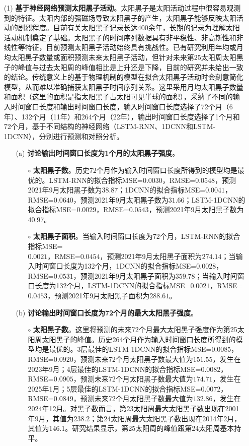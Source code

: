 \begin{enumerate}
  \item[(1)] \textbf{基于神经网络预测太阳黑子活动}。太阳黑子是太阳活动过程中很容易观测到的特征。太阳内部的强磁场导致太阳黑子的产生，太阳黑子能够反映太阳活动的剧烈程度。目前有关太阳黑子记录长达400余年，长期的记录为理解太阳活动机制奠定了基础。太阳黑子的时间序列数据具有非平稳性、非高斯性和非线性等特征，目前预测太阳黑子活动始终具有挑战性。已有研究利用年均或月均太阳黑子数量或面积预测未来太阳黑子活动，但针对未来第25太阳周太阳黑子的峰值与过去太阳周的峰值相比是上升还是下降，目前的研究并未给出一致的结论。传统意义上的基于物理机制的模型在拟合太阳黑子活动时会刻意简化模型，从而难以准确捕获太阳黑子时间序列关系。这里采用月均太阳黑子数量和面积（这里的面积是指太阳黑子占太阳可见半球的面积），采纳了不同的输入时间窗口长度和输出时间窗口长度，输入时间窗口长度选择了72个月（6年）、132个月（11年）和264个月（22年），输出时间窗口长度选择了1个月和72个月，基于不同结构的神经网络（LSTM-RNN、1DCNN和LSTM-1DCNN），分别进行预测和对照分析。
  \begin{itemize}
    \item[(a)] \textbf{讨论输出时间窗口长度为1个月的太阳黑子强度}。
    \begin{itemize}
      \item[$\circ$] \textbf{太阳黑子数}。历史72个月作为输入时间窗口长度所得到的模型均是最优的。LSTM-RNN的拟合指标MSE=$0.0030$，RMSE=$0.0548$，预测2021年9月太阳黑子数为$38.87$；1DCNN的拟合指标MSE=$0.0041$，RMSE=$0.0640$，预测2021年9月太阳黑子数为$31.66$；LSTM-1DCNN的拟合指标MSE=$0.0029$，RMSE=$0.0543$，预测2021年9月太阳黑子数为$40.97$。
      \item[$\circ$] \textbf{太阳黑子面积}。当输入时间窗口长度为72个月，LSTM-RNN的拟合指标MSE=\\$0.0021$，RMSE=$0.0454$，预测2021年9月太阳黑子面积为$274.14$；当输入时间窗口长度为132个月，1DCNN的拟合指标MSE=$0.0028$，RMSE=$0.0531$，预测2021年9月太阳黑子面积为$359.78$；当输入时间窗口长度为132个月，LSTM-1DCNN的拟合指标MSE=$0.0021$，RMSE=$0.0453$，预测2021年9月太阳黑子面积为$288.61$。
    \end{itemize}
    \item[(b)] \textbf{讨论输出时间窗口长度为72个月的最大太阳黑子强度}。
    \begin{itemize}
      \item[$\circ$] \textbf{太阳黑子数}。这里将预测的未来72个月最大太阳黑子强度作为第25太阳周太阳黑子的峰值。历史264个月作为输入时间窗口长度所得到的模型均是最优的。3层最佳的LSTM-1DCNN的拟合指标MSE=$0.0085$，RMSE=$0.0920$，预测未来72个月太阳黑子数最大值为$151.55$，发生在2023年9月；4层最佳的LSTM-1DCNN的拟合指标MSE=$0.0082$，RMSE=$0.0905$，预测未来72个月太阳黑子数最大值为$174.71$，发生在2025年1月；5层最佳的LSTM-1DCNN的拟合指标MSE=$0.0072$，RMSE=$0.0849$，预测未来72个月太阳黑子数最大值为$132.86$，发生在2024年12月。对黑子数而言，第23太阳周最大太阳黑子数出现在2001年9月，其值为238.2；第24太阳周最大太阳黑子数出现在2014年2月，其值为146.1。研究结果显示，第25太阳周的峰值跟第24太阳周基本持平。 

\end{itemize}
\end{itemize}
\end{enumerate}
